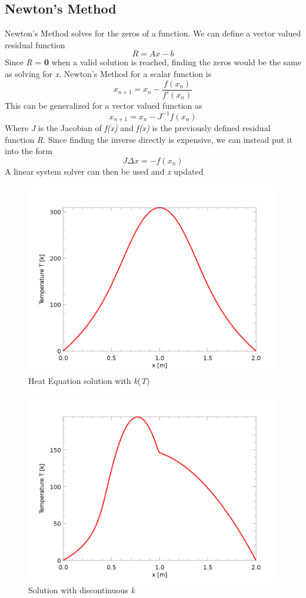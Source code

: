 \documentclass[12pt,twocolumn]{article}
\begin{document}
\subsection*{Newton's Method}
Newton's Method solves for the zeros of a function. We can define a vector valued residual function
\[R = Ax-b\]
Since \emph{R} = \textbf{0} when a valid solution is reached, finding the zeros would be the
same as solving for \emph{x}. Newton's Method for a scalar function is
\[x_{n+1} = x_n-\frac{f(x_n)}{f'(x_n)}\]
This can be generalized for a vector valued function as
\[x_{n+1} = x_n-J^{-1}f(x_n)\]
Where \emph{J} is the Jacobian of \emph{f(x)} and \emph{f(x)} is the previously defined residual function \emph{R}. Since 
finding the inverse directly is expensive, we can instead put it into the form
\[J\Delta x = -f(x_n)\]
A linear system solver can then be used and \emph{x} updated
\begin{figure}
\includegraphics[width=\columnwidth]{regsolution.png}
\footnotesize{\caption{Heat Equation solution with \emph{k}(\emph{T})}}
\end{figure}
\begin{figure}
\includegraphics[width=\columnwidth]{discontheat.png}
\footnotesize{\caption{Solution with discontinuous \emph{k}}}
\end{figure}
\end{document}

